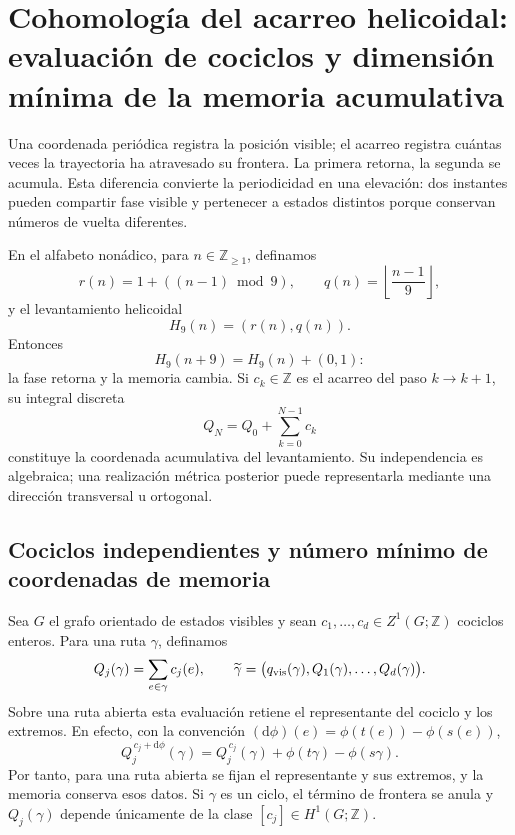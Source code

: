 \chapter{Cohomología del acarreo helicoidal: evaluación de cociclos y dimensión mínima de la memoria acumulativa}
\label{chap:elevacion-cohomologica-dimension-rev2}

Una coordenada periódica registra la posición visible; el acarreo registra
cuántas veces la trayectoria ha atravesado su frontera. La primera retorna,
la segunda se acumula. Esta diferencia convierte la periodicidad en una
elevación: dos instantes pueden compartir fase visible y pertenecer a estados
distintos porque conservan números de vuelta diferentes.

En el alfabeto nonádico, para \(n\in\mathbb Z_{\geq1}\), definamos
\[
 r(n)=1+((n-1)\bmod9),
 \qquad
 q(n)=\left\lfloor\frac{n-1}{9}\right\rfloor,
\]
y el levantamiento helicoidal
\begin{equation}
 H_9(n)=(r(n),q(n)).
 \label{eq:elevacion-helicoidal-nonadica-rev2}
\end{equation}
Entonces
\[
 H_9(n+9)=H_9(n)+(0,1):
\]
la fase retorna y la memoria cambia. Si \(c_k\in\mathbb Z\) es el acarreo
del paso \(k\to k+1\), su integral discreta
\begin{equation}
 Q_N=Q_0+\sum_{k=0}^{N-1}c_k
 \label{eq:integral-discreta-carry-rev2}
\end{equation}
constituye la coordenada acumulativa del levantamiento. Su independencia es
algebraica; una realización métrica posterior puede representarla mediante
una dirección transversal u ortogonal.

\section{Cociclos independientes y número mínimo de coordenadas de memoria}

Sea \(G\) el grafo orientado de estados visibles y sean
\(c_1,\ldots,c_d\in Z^1(G;\mathbb Z)\) cociclos enteros. Para una ruta
\(\gamma\), definamos
\[
 Q_j(\gamma)=\sum_{e\in\gamma}c_j(e),
 \qquad
 \widetilde\gamma=
 \bigl(q_{\rm vis}(\gamma),Q_1(\gamma),\ldots,Q_d(\gamma)\bigr).
\]
Sobre una ruta abierta esta evaluación retiene el representante del cociclo
y los extremos. En efecto, con la convención
\((\mathrm d\phi)(e)=\phi(t(e))-\phi(s(e))\),
\begin{equation}
 Q_j^{\,c_j+\mathrm d\phi}(\gamma)
 =Q_j^{\,c_j}(\gamma)+\phi(t\gamma)-\phi(s\gamma).
 \label{eq:cambio-representante-cociclo-ruta-rev2}
\end{equation}
Por tanto, para una ruta abierta se fijan el representante y sus extremos,
y la memoria conserva esos datos. Si \(\gamma\) es un ciclo, el término de
frontera se anula y \(Q_j(\gamma)\) depende únicamente de la clase
\([c_j]\in H^1(G;\mathbb Z)\).

